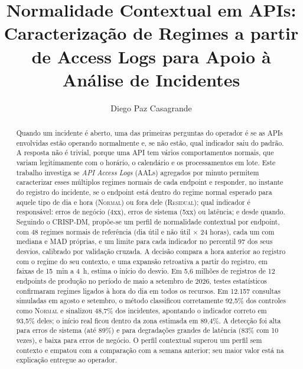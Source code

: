 \documentclass[sigconf,nonacm]{acmart}
\newcommand{\Normal}{\textsc{Normal}\xspace}
\newcommand{\Residual}{\textsc{Residual}\xspace}
\begin{document}
\title{Normalidade Contextual em APIs: Caracterização de Regimes a partir de Access Logs para Apoio à Análise de Incidentes}

\author{Diego Paz Casagrande}

\renewcommand{\shortauthors}{D. P. Casagrande}

\begin{abstract}
Quando um incidente é aberto, uma das primeiras perguntas do operador é se as APIs envolvidas estão operando normalmente e, se não estão, qual indicador saiu do padrão. A resposta não é trivial, porque uma API tem vários comportamentos normais, que variam legitimamente com o horário, o calendário e os processamentos em lote. Este trabalho investiga se \emph{API Access Logs} (AALs) agregados por minuto permitem caracterizar esses múltiplos regimes normais de cada endpoint e responder, no instante do registro do incidente, se o endpoint está dentro do regime normal esperado para aquele tipo de dia e hora (\Normal) ou fora dele (\Residual); qual indicador é responsável: erros de negócio (4xx), erros de sistema (5xx) ou latência; e desde quando. Seguindo o CRISP-DM, propõe-se um perfil de normalidade contextual por endpoint, com 48 regimes normais de referência (dia útil e não útil $\times$ 24 horas), cada um com mediana e MAD próprias, e um limite para cada indicador no percentil 97 dos seus desvios, calibrado por validação cruzada. A decisão compara a hora anterior ao registro com o regime do seu contexto, e uma expansão retroativa a partir do registro, em faixas de 15~min a 4~h, estima o início do desvio. Em 5,6 milhões de registros de 12 endpoints de produção no período de maio a setembro de 2026, testes estatísticos confirmaram regimes ligados à hora do dia em todos os recursos. Em 12.157 consultas simuladas em agosto e setembro, o método classificou corretamente 92,5\% dos controles como \Normal e sinalizou 48,7\% dos incidentes, apontando o indicador correto em 93,5\% deles; o início real ficou dentro da zona estimada em 89,4\%. A detecção foi alta para erros de sistema (até 89\%) e para degradações grandes de latência (83\% com 10 vezes), e baixa para erros de negócio. O perfil contextual superou um perfil sem contexto e empatou com a comparação com a semana anterior; seu maior valor está na explicação entregue ao operador.
\end{abstract}

\end{document}
